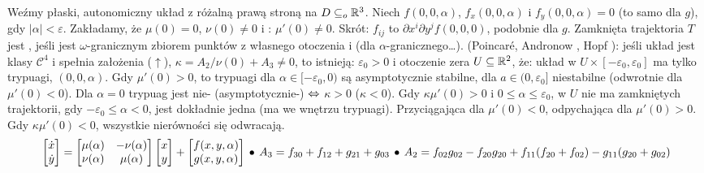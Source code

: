 Weźmy  płaski, autonomiczny układ z różalną prawą stroną na $D \subseteq_o \mathbb{R}^3$.
Niech $f(0,0,\alpha)$, $f_x (0,0,\alpha)$ i $f_y(0,0,\alpha) = 0$ (to samo dla $g$), gdy $|\alpha| < \varepsilon$.
Zakładamy, że $\mu(0) = 0$, $\nu(0) \neq 0$ i : $\mu'(0) \neq 0$.
Skrót: $f_{ij}$ to $\partial {x^i} \partial {y^j} f (0,0,0)$, podobnie dla $g$.
Zamknięta trajektoria $T$ jest , jeśli jest $\omega$-granicznym zbiorem punktów z własnego otoczenia i  (dla $\alpha$-granicznego\dots).
 (Poincaré, Andronow , Hopf ): jeśli układ jest klasy $\mathscr C^4$ i spełnia założenia ($\uparrow$), $\kappa = A_2 / \nu(0) + A_3 \neq 0$, to istnieją: $\varepsilon_0 > 0$ i  otoczenie zera $U \subseteq \mathbb{R}^2$, że: układ w $U \times [-\varepsilon_0, \varepsilon_0]$ ma tylko trypuagi, $(0,0,\alpha)$.
Gdy $\mu'(0)>0$, to trypuagi dla $\alpha \in [-\varepsilon_0, 0)$ są asymptotycznie stabilne, dla $a \in (0, \varepsilon_0]$ niestabilne (odwrotnie dla $\mu'(0)<0$).
Dla $\alpha = 0$ trypuag jest nie- (asymptotycznie-) $\Leftrightarrow$ $\kappa > 0$ ($\kappa < 0$).
Gdy $\kappa \mu'(0) > 0$ i $0 \le \alpha \le \varepsilon_0$, w $U$ nie ma zamkniętych trajektorii, gdy $- \varepsilon_0 \le \alpha < 0$, jest dokładnie jedna (ma we wnętrzu trypuagi).
Przyciągająca dla $\mu'(0) < 0$, odpychająca dla $\mu'(0) > 0$.
Gdy $\kappa \mu'(0) < 0$, wszystkie nierówności się odwracają.
\[
	\begin{bmatrix}	\dot x \\ \dot y \end{bmatrix}
	= \begin{bmatrix} \mu(\alpha) & -\nu(\alpha) \\ \nu(\alpha) & \mu(\alpha) \end{bmatrix}
	\begin{bmatrix}	x  \\	y \end{bmatrix} + 
	\begin{bmatrix}	f(x,y,\alpha)   \\	g(x,y,\alpha) \end{bmatrix} \, \bullet \,
	A_3 = f_{30} + f_{12} + g_{21} + g_{03} \, \bullet \,
	A_2 = f_{02}g_{02} - f_{20}g_{20} + f_{11}(f_{20} + f_{02}) - g_{11}(g_{20} + g_{02})
\]